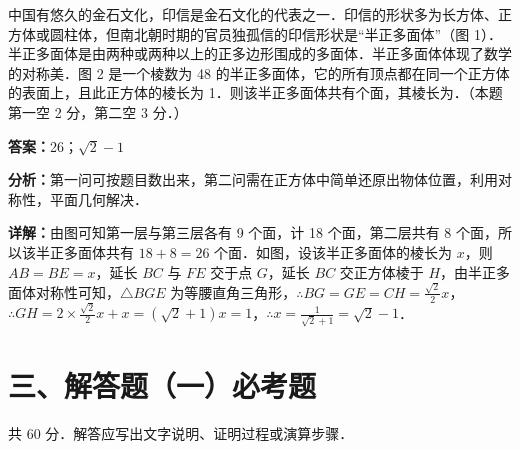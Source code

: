 \begin{question}[points=5]
中国有悠久的金石文化，印信是金石文化的代表之一．印信的形状多为长方体、正方体或圆柱体，但南北朝时期的官员独孤信的印信形状是“半正多面体”（图 1）．半正多面体是由两种或两种以上的正多边形围成的多面体．半正多面体体现了数学的对称美．图 2 是一个棱数为 48 的半正多面体，它的所有顶点都在同一个正方体的表面上，且此正方体的棱长为 1．则该半正多面体共有个面，其棱长为．（本题第一空 2 分，第二空 3 分．）
\fillin[{26；$\sqrt{2}-1$}]
\begin{solution}
\textbf{答案：}26；$\sqrt{2}-1$

\textbf{分析：}第一问可按题目数出来，第二问需在正方体中简单还原出物体位置，利用对称性，平面几何解决．

\textbf{详解：}由图可知第一层与第三层各有 9 个面，计 18 个面，第二层共有 8 个面，所以该半正多面体共有 $18+8=26$ 个面．如图，设该半正多面体的棱长为 $x$，则 $AB=BE=x$，延长 $BC$ 与 $FE$ 交于点 $G$，延长 $BC$ 交正方体棱于 $H$，由半正多面体对称性可知，$\triangle BGE$ 为等腰直角三角形，$\therefore BG=GE=CH=\frac{\sqrt{2}}{2}x$，$\therefore GH=2\times\frac{\sqrt{2}}{2}x+x=(\sqrt{2}+1)x=1$，$\therefore x=\frac{1}{\sqrt{2}+1}=\sqrt{2}-1$．
\end{solution}
\end{question}

\section*{三、解答题（一）必考题}
共 60 分．解答应写出文字说明、证明过程或演算步骤．

